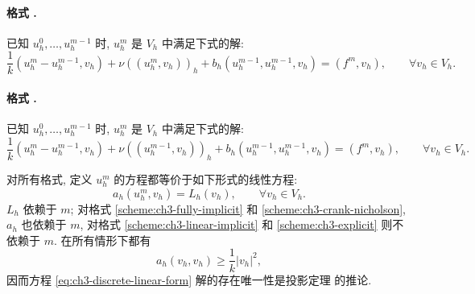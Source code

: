 \label{scheme:ch3-linear-implicit}
\paragraph{格式 \thembscheme.}
已知 $u_h^0,\ldots,u_h^{m-1}$ 时, $u_h^m$ 是 $V_h$ 中满足下式的解:
\begin{equation}
\frac1k(u_h^m-u_h^{m-1},v_h)+\nu((u_h^m,v_h))_h
+b_h(u_h^{m-1},u_h^{m-1},v_h)=(f^m,v_h),
\qquad\forall v_h\in V_h.
\label{eq:ch3-scheme-53}
\end{equation}

\hypertarget{chapter-03-page-242}{}
\label{scheme:ch3-explicit}
\paragraph{格式 \thembscheme.}
已知 $u_h^0,\ldots,u_h^{m-1}$ 时, $u_h^m$ 是 $V_h$ 中满足下式的解:
\begin{equation}
\frac1k(u_h^m-u_h^{m-1},v_h)+\nu((u_h^{m-1},v_h))_h
+b_h(u_h^{m-1},u_h^{m-1},v_h)=(f^m,v_h),
\qquad\forall v_h\in V_h.
\label{eq:ch3-scheme-54}
\end{equation}

对所有格式, 定义 $u_h^m$ 的方程都等价于如下形式的线性方程:
\begin{equation}
a_h(u_h^m,v_h)=L_h(v_h),
\qquad\forall v_h\in V_h.
\label{eq:ch3-discrete-linear-form}
\end{equation}
$L_h$ 依赖于 $m$; 对格式 \ref{scheme:ch3-fully-implicit} 和 \ref{scheme:ch3-crank-nicholson}, $a_h$ 也依赖于 $m$, 对格式 \ref{scheme:ch3-linear-implicit} 和 \ref{scheme:ch3-explicit} 则不依赖于 $m$. 在所有情形下都有
\begin{equation}
a_h(v_h,v_h)\geq\frac1k|v_h|^2,
\label{eq:ch3-discrete-linear-coercivity}
\end{equation}
因而方程 \eqref{eq:ch3-discrete-linear-form} 解的存在唯一性是投影定理  的推论.

